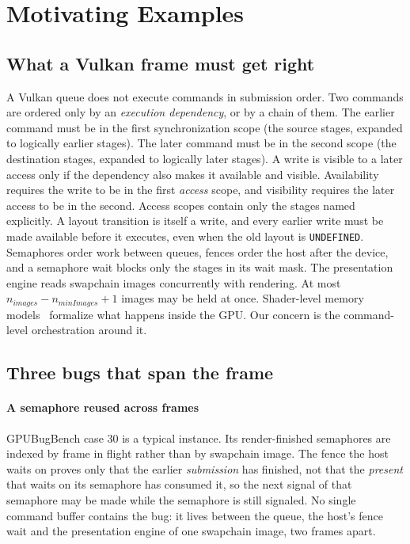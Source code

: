 \documentclass[acmtog,anonymous,review]{acmart}
\newcommand{\bench}{GPUBugBench\xspace}
\newcommand{\code}[1]{\texttt{#1}}
\begin{document}
\section{Motivating Examples}
\label{sec:motivation}

\subsection{What a Vulkan frame must get right}
A Vulkan queue does not execute commands in submission order. Two commands are ordered only by an
\emph{execution dependency}, or by a chain of them. The earlier command must be in the first synchronization scope
(the source stages, expanded to logically earlier stages). The later command must be in the second scope (the
destination stages, expanded to logically later stages).
A write is visible to a later access only if the dependency also makes it available and visible. Availability
requires the write to be in the first \emph{access} scope, and visibility requires the later access to be in the
second. Access scopes contain only the stages named explicitly.
A layout transition is itself a write, and every earlier write must be made available before it executes, even when
the old layout is \code{UNDEFINED}. Semaphores order work between queues, fences order the host after the
device, and a semaphore wait blocks only the stages in its wait mask.
The presentation engine reads swapchain images concurrently with rendering. At most
$n_{\mathit{images}} - n_{\mathit{minImages}} + 1$ images may be held at once.
Shader-level memory models~\cite{tong2024gpuconsistency} formalize what happens inside the GPU. Our concern is the
command-level orchestration around it.

\subsection{Three bugs that span the frame}
\paragraph{A semaphore reused across frames}
\bench case 30 is a typical instance. Its render-finished semaphores are indexed by frame in flight rather than
by swapchain image. The fence the host waits on proves only that the earlier \emph{submission} has finished, not that
the \emph{present} that waits on its semaphore has consumed it, so the next signal of that semaphore may be made while
the semaphore is still signaled. No single command buffer contains the bug: it lives between the queue, the host's
fence wait and the presentation engine of one swapchain image, two frames apart.
\end{document}
